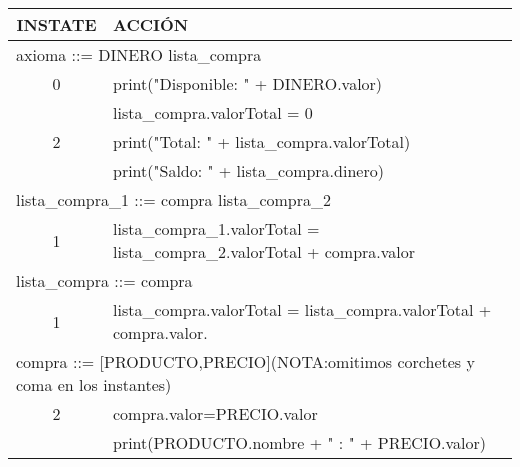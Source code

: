 \documentclass[nochap]{apuntes}
\begin{document}
\begin{problem}
\begin{tabular}{|c|l|}
\hline
INSTATE & ACCIÓN \\
\hline
\multicolumn{2}{|l|}{axioma ::= DINERO lista\_compra} \\
\hline
 0 & print("Disponible: " + DINERO.valor) \\ & lista\_compra.valorTotal = 0\\
 \hline
 2 &
  print("Total: " + lista\_compra.valorTotal) \\ &
  print("Saldo: " + lista\_compra.dinero)\\
 \hline
\multicolumn{2}{|l|}{lista\_compra\_1 ::= compra lista\_compra\_2} \\
\hline
 1 & lista\_compra\_1.valorTotal = lista\_compra\_2.valorTotal + compra.valor \\
\hline
\multicolumn{2}{|l|}{lista\_compra ::= compra} \\
\hline
 1 & lista\_compra.valorTotal = lista\_compra.valorTotal + compra.valor. \\
\hline
\multicolumn{2}{|l|}{compra ::= [PRODUCTO,PRECIO](NOTA:omitimos corchetes y coma en los instantes)}\\
\hline
2 & compra.valor=PRECIO.valor \\ & print(PRODUCTO.nombre + " : " + PRECIO.valor)\\
\hline

\end{tabular}


\end{problem}
\end{document}
